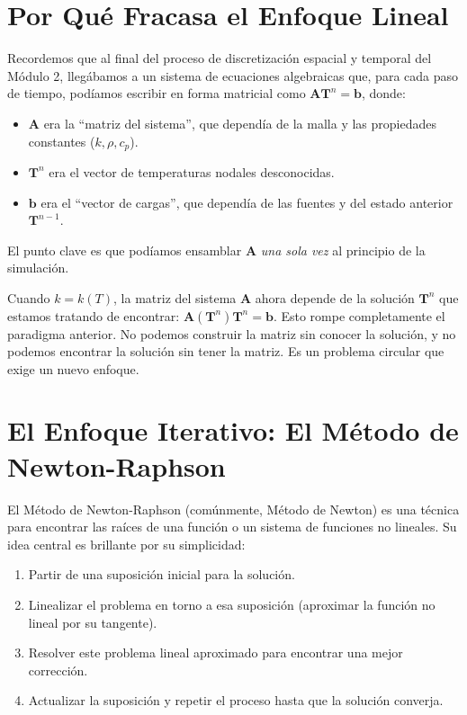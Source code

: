 \documentclass[11pt, a4paper]{article}
\begin{document}
\section{Por Qué Fracasa el Enfoque Lineal}
Recordemos que al final del proceso de discretización espacial y temporal del Módulo 2, llegábamos a un sistema de ecuaciones algebraicas que, para cada paso de tiempo, podíamos escribir en forma matricial como $\mathbf{A} \mathbf{T}^n = \mathbf{b}$, donde:
\begin{itemize}
    \item $\mathbf{A}$ era la ``matriz del sistema'', que dependía de la malla y las propiedades constantes ($k, \rho, c_p$).
    \item $\mathbf{T}^n$ era el vector de temperaturas nodales desconocidas.
    \item $\mathbf{b}$ era el ``vector de cargas'', que dependía de las fuentes y del estado anterior $\mathbf{T}^{n-1}$.
\end{itemize}
El punto clave es que podíamos ensamblar $\mathbf{A}$ \textit{una sola vez} al principio de la simulación.

Cuando $k = k(T)$, la matriz del sistema $\mathbf{A}$ ahora depende de la solución $\mathbf{T}^n$ que estamos tratando de encontrar: $\mathbf{A}(\mathbf{T}^n) \mathbf{T}^n = \mathbf{b}$. Esto rompe completamente el paradigma anterior. No podemos construir la matriz sin conocer la solución, y no podemos encontrar la solución sin tener la matriz. Es un problema circular que exige un nuevo enfoque.

\newpage
\section{El Enfoque Iterativo: El Método de Newton-Raphson}
El Método de Newton-Raphson (comúnmente, Método de Newton) es una técnica para encontrar las raíces de una función o un sistema de funciones no lineales. Su idea central es brillante por su simplicidad:
\begin{enumerate}
    \item Partir de una suposición inicial para la solución.
    \item Linealizar el problema en torno a esa suposición (aproximar la función no lineal por su tangente).
    \item Resolver este problema lineal aproximado para encontrar una mejor corrección.
    \item Actualizar la suposición y repetir el proceso hasta que la solución converja.
\end{enumerate}
\end{document}
